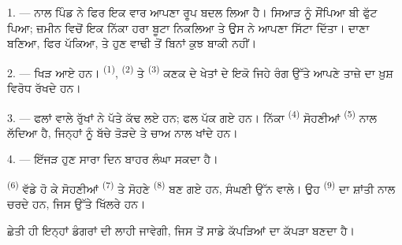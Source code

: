 %


\VUsaut{5.0mm}
\VUsaut{3.0mm}
\VUsaut{3.0mm}
\VUsaut{4.0mm}
\VUsaut{3.0mm}

1. ---  ਨਾਲ ਪਿੰਡ ਨੇ ਫਿਰ ਇਕ ਵਾਰ ਆਪਣਾ ਰੂਪ ਬਦਲ ਲਿਆ ਹੈ। ਸਿਆੜ ਨੂੰ
ਸੌਂਪਿਆ ਬੀ ਫੁੱਟ ਪਿਆ; ਜ਼ਮੀਨ ਵਿਚੋਂ ਇਕ ਨਿੱਕਾ ਹਰਾ ਬੂਟਾ ਨਿਕਲਿਆ ਤੇ ਉਸ ਨੇ ਆਪਣਾ ਸਿੱਟਾ
ਦਿੱਤਾ। ਦਾਣਾ ਬਣਿਆ, ਫਿਰ ਪੱਕਿਆ, ਤੇ ਹੁਣ ਵਾਢੀ ਤੋਂ ਬਿਨਾਂ ਕੁਝ ਬਾਕੀ ਨਹੀਂ।

2. ---  ਖਿੜ ਆਏ ਹਨ।  \textsuperscript{(1)},
 \textsuperscript{(2)} ਤੇ 
\textsuperscript{(3)} ਕਣਕ ਦੇ ਖੇਤਾਂ ਦੇ ਇਕੋ ਜਿਹੇ ਰੰਗ ਉੱਤੇ ਆਪਣੇ ਤਾਜ਼ੇ 
ਦਾ ਖ਼ੁਸ਼ ਵਿਰੋਧ ਰੱਖਦੇ ਹਨ।

3. --- ਫਲਾਂ ਵਾਲੇ ਰੁੱਖਾਂ ਨੇ ਪੱਤੇ ਕੱਢ ਲਏ ਹਨ; ਫਲ ਪੱਕ ਗਏ ਹਨ। ਨਿੱਕਾ
 \textsuperscript{(4)} ਸੋਹਣੀਆਂ 
\textsuperscript{(5)} ਨਾਲ ਲੱਦਿਆ ਹੈ, ਜਿਨ੍ਹਾਂ ਨੂੰ ਬੱਚੇ ਤੋੜਦੇ ਤੇ ਚਾਅ ਨਾਲ ਖਾਂਦੇ ਹਨ।

4. --- ਇੱਜੜ ਹੁਣ ਸਾਰਾ ਦਿਨ ਬਾਹਰ ਲੰਘਾ ਸਕਦਾ ਹੈ।

 \textsuperscript{(6)} ਵੱਡੇ ਹੋ ਕੇ ਸੋਹਣੀਆਂ 
\textsuperscript{(7)} ਤੇ ਸੋਹਣੇ  \textsuperscript{(8)} ਬਣ ਗਏ ਹਨ, ਸੰਘਣੀ
ਉੱਨ ਵਾਲੇ। ਉਹ  \textsuperscript{(9)} ਦਾ  ਸ਼ਾਂਤੀ ਨਾਲ ਚਰਦੇ
ਹਨ, ਜਿਸ ਉੱਤੇ  ਖਿੱਲਰੇ ਹਨ।

ਛੇਤੀ ਹੀ ਇਨ੍ਹਾਂ ਡੰਗਰਾਂ ਦੀ  ਲਾਹੀ ਜਾਵੇਗੀ, ਜਿਸ ਤੋਂ ਸਾਡੇ ਕੱਪੜਿਆਂ ਦਾ ਕੱਪੜਾ
ਬਣਦਾ ਹੈ।

